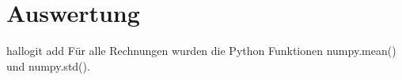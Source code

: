 \section{Auswertung}
\label{sec:Auswertung}

hallogit add
Für alle Rechnungen wurden die Python Funktionen numpy.mean() und numpy.std().



